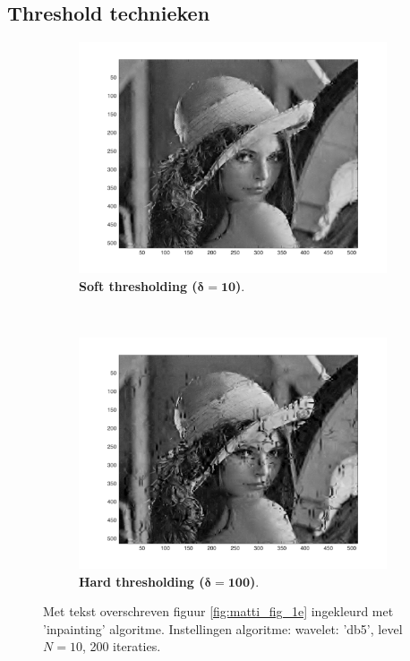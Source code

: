 \FloatBarrier


\subsection{Threshold technieken}

\begin{figure}[!]
    \centering
    \begin{subfigure}[b]{0.45\textwidth}
        \includegraphics[width=\textwidth]{../src/inpainting/lena_soft_2}
        \caption{ \textbf{Soft thresholding ($\mathbf{\delta = 10 }$)}.}
        \label{fig:matti_soft_2}
    \end{subfigure}
    ~ %
    \begin{subfigure}[b]{0.45\textwidth}
        \includegraphics[width=\textwidth]{../src/inpainting/lena_hard_2}
        \caption{ \textbf{Hard thresholding ($\mathbf{\delta = 100 }$)}.}
        \label{fig:matti_hard_2}
    \end{subfigure}
    \caption{Met tekst overschreven figuur \ref{fig:matti_fig_1e} ingekleurd met 'inpainting' algoritme. Instellingen algoritme: wavelet: 'db5', level $N = 10$, 200 iteraties.}\label{fig:matti_hardsoft}
\end{figure}

